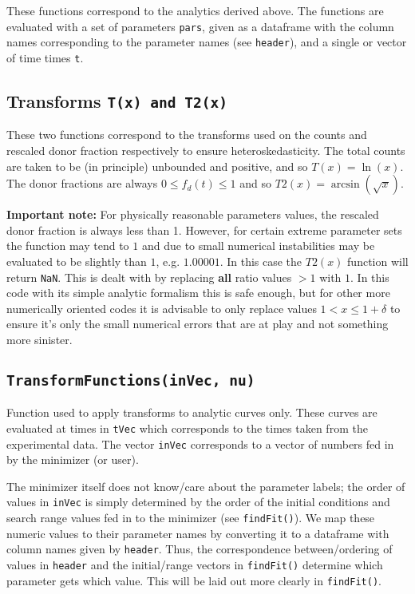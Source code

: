 \documentclass{tufte-book} %
\begin{document}
These functions correspond to the analytics derived above. The functions are evaluated with a set of parameters \texttt{pars}, given as a dataframe with the column names corresponding to the parameter names (see \texttt{header}), and a single or vector of time times \texttt{t}.
\subsection{Transforms \texttt{T(x) and T2(x)}} 

 These two functions correspond to the transforms used on the counts and rescaled donor fraction respectively to ensure heteroskedasticity. The total counts are taken to be (in principle) unbounded and positive, and so $T(x) = \ln(x)$. The donor fractions are always $0\leq f_d(t) \leq 1$ and so $T2(x) = \arcsin\left(\sqrt{x}\right)$. 

\textbf{Important note:} For physically reasonable parameters values, the rescaled donor fraction is always less than 1. However, for certain extreme parameter sets the function may tend to $1$ and due to small numerical instabilities may be evaluated to be slightly  than $1$, e.g. $1.00001$. In this case the $T2(x)$ function will return \texttt{NaN}. This is dealt with by replacing \textbf{all} ratio values $>1$ with $1$. In this code with its simple analytic formalism this is safe enough, but for other more numerically oriented codes it is advisable to only replace values $1< x \leq 1+\delta$ to ensure it's only the small numerical errors that are at play and not something more sinister.
\subsection{\texttt{TransformFunctions(inVec, nu)}} 

Function used to apply transforms to analytic curves only. These curves are evaluated at times in \texttt{tVec} which corresponds to the times taken from the experimental data. The vector \texttt{inVec} corresponds to a vector of numbers fed in by the minimizer (or user).

The minimizer itself does not know/care about the parameter labels; the order of values in \texttt{inVec} is simply determined by the order of the initial conditions and search range values fed in to the minimizer (see \texttt{findFit()}). We map these numeric values to their parameter names by converting it to a dataframe with column names given by \texttt{header}. Thus, the correspondence between/ordering of values in \texttt{header} and the initial/range vectors in \texttt{findFit()} determine which parameter gets which value. This will be laid out more clearly in \texttt{findFit()}.
\end{document}
